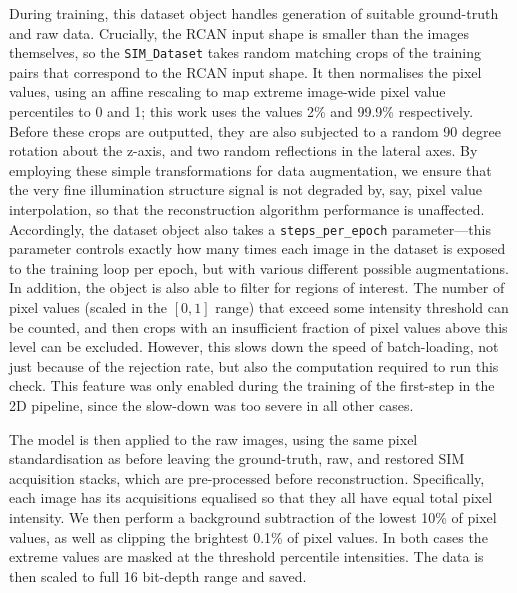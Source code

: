 \documentclass[12pt]{article}
\begin{document}
During training, this dataset object handles generation of suitable ground-truth and raw data.
Crucially, the RCAN input shape is smaller than the images themselves,
so the \texttt{SIM\_Dataset} takes random matching crops of the training pairs that correspond to the RCAN input shape.
It then normalises the pixel values, using an affine rescaling to map extreme image-wide pixel value percentiles to 0 and 1;
this work uses the values 2\% and 99.9\% respectively.
Before these crops are outputted, they are also subjected to a random 90 degree rotation about the z-axis,
and two random reflections in the lateral axes.
By employing these simple transformations for data augmentation,
we ensure that the very fine illumination structure signal is not degraded by, say, pixel value interpolation,
so that the reconstruction algorithm performance is unaffected.
Accordingly, the dataset object also takes a \texttt{steps\_per\_epoch} parameter---this
parameter controls exactly how many times each image in the dataset is exposed to the training loop per epoch,
but with various different possible augmentations.
In addition, the object is also able to filter for regions of interest.
The number of pixel values (scaled in the $[0, 1]$ range) that exceed some intensity threshold can be counted,
and then crops with an insufficient fraction of pixel values above this level can be excluded.
However, this slows down the speed of batch-loading, not just because of the rejection rate,
but also the computation required to run this check.
This feature was only enabled during the training of the first-step in the 2D pipeline,
since the slow-down was too severe in all other cases.

The model is then applied to the raw images, using the same pixel standardisation as before
leaving the ground-truth, raw, and restored SIM acquisition stacks,
which are pre-processed before reconstruction.
Specifically, each image has its acquisitions equalised so that they all have equal total pixel intensity.
We then perform a background subtraction of the lowest 10\% of pixel values, as well as clipping the brightest 0.1\% of pixel values.
In both cases the extreme values are masked at the threshold percentile intensities.
The data is then scaled to full 16 bit-depth range and saved.
\end{document}
